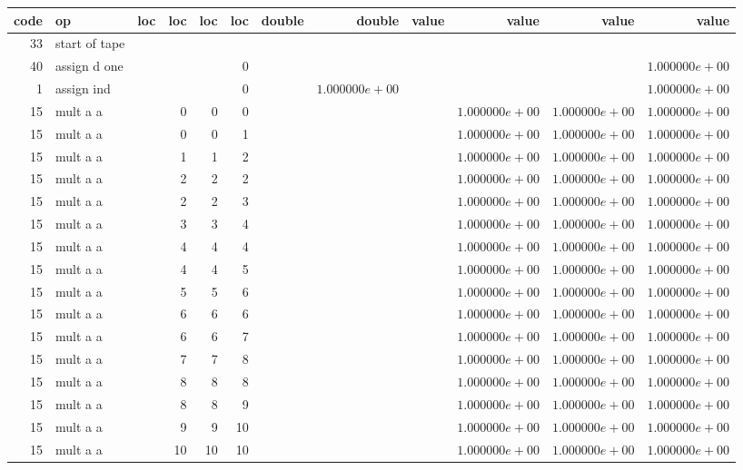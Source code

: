 \documentclass{article}
\begin{document}
\tiny
\begin{tabular}{|r|l|r|r|r|r||r|r||r|r|r|r|} \hline 
 code & op & loc & loc & loc & loc & double & double & value & value & value & value \\ \hline 
 33 & start of tape & & & & & & & & & &  \\ \hline 
40 & assign d one & & & & 0 & & & & & &$ 1.000000e+00 $\\ \hline 
1 & assign ind & & & & 0 & &$ 1.000000e+00 $& & & &$ 1.000000e+00 $\\ \hline 
15 & mult a a & & 0 & 0 & 0 & & & &$ 1.000000e+00 $&$ 1.000000e+00 $&$ 1.000000e+00 $\\ \hline 
15 & mult a a & & 0 & 0 & 1 & & & &$ 1.000000e+00 $&$ 1.000000e+00 $&$ 1.000000e+00 $\\ \hline 
15 & mult a a & & 1 & 1 & 2 & & & &$ 1.000000e+00 $&$ 1.000000e+00 $&$ 1.000000e+00 $\\ \hline 
15 & mult a a & & 2 & 2 & 2 & & & &$ 1.000000e+00 $&$ 1.000000e+00 $&$ 1.000000e+00 $\\ \hline 
15 & mult a a & & 2 & 2 & 3 & & & &$ 1.000000e+00 $&$ 1.000000e+00 $&$ 1.000000e+00 $\\ \hline 
15 & mult a a & & 3 & 3 & 4 & & & &$ 1.000000e+00 $&$ 1.000000e+00 $&$ 1.000000e+00 $\\ \hline 
15 & mult a a & & 4 & 4 & 4 & & & &$ 1.000000e+00 $&$ 1.000000e+00 $&$ 1.000000e+00 $\\ \hline 
15 & mult a a & & 4 & 4 & 5 & & & &$ 1.000000e+00 $&$ 1.000000e+00 $&$ 1.000000e+00 $\\ \hline 
15 & mult a a & & 5 & 5 & 6 & & & &$ 1.000000e+00 $&$ 1.000000e+00 $&$ 1.000000e+00 $\\ \hline 
15 & mult a a & & 6 & 6 & 6 & & & &$ 1.000000e+00 $&$ 1.000000e+00 $&$ 1.000000e+00 $\\ \hline 
15 & mult a a & & 6 & 6 & 7 & & & &$ 1.000000e+00 $&$ 1.000000e+00 $&$ 1.000000e+00 $\\ \hline 
15 & mult a a & & 7 & 7 & 8 & & & &$ 1.000000e+00 $&$ 1.000000e+00 $&$ 1.000000e+00 $\\ \hline 
15 & mult a a & & 8 & 8 & 8 & & & &$ 1.000000e+00 $&$ 1.000000e+00 $&$ 1.000000e+00 $\\ \hline 
15 & mult a a & & 8 & 8 & 9 & & & &$ 1.000000e+00 $&$ 1.000000e+00 $&$ 1.000000e+00 $\\ \hline 
15 & mult a a & & 9 & 9 & 10 & & & &$ 1.000000e+00 $&$ 1.000000e+00 $&$ 1.000000e+00 $\\ \hline 
15 & mult a a & & 10 & 10 & 10 & & & &$ 1.000000e+00 $&$ 1.000000e+00 $&$ 1.000000e+00 $\\ \hline 

\end{tabular}
\end{document}
